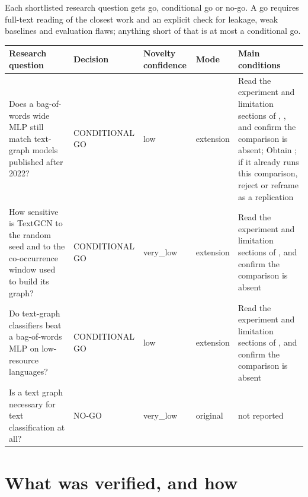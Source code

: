 \documentclass[11pt,a4paper]{article}
\begin{document}
Each shortlisted research question gets go, conditional go or no-go. A go requires full-text reading of the closest work and an explicit check for leakage, weak baselines and evaluation flaws; anything short of that is at most a conditional go.

{\small
\begin{longtable}{>{\raggedright\arraybackslash}p{}>{\raggedright\arraybackslash}p{}>{\raggedright\arraybackslash}p{}>{\raggedright\arraybackslash}p{}>{\raggedright\arraybackslash}p{}}
\toprule
\textbf{Research question} & \textbf{Decision} & \textbf{Novelty confidence} & \textbf{Mode} & \textbf{Main conditions} \\
\midrule
\endhead
Does a bag-of-words wide MLP still match text-graph models published after 2022? & CONDITIONAL GO & low & extension & Read the experiment and limitation sections of \cite{galke2022}, \cite{abdalla2023}, \cite{donabauer2025} and confirm the comparison is absent; Obtain \cite{abdalla2023}; if it already runs this comparison, reject or reframe as a replication \\
How sensitive is TextGCN to the random seed and to the co-occurrence window used to build its graph? & CONDITIONAL GO & very\_low & extension & Read the experiment and limitation sections of \cite{shchur2019}, \cite{galke2022} and confirm the comparison is absent \\
Do text-graph classifiers beat a bag-of-words MLP on low-resource languages? & CONDITIONAL GO & low & extension & Read the experiment and limitation sections of \cite{ghosh2022}, \cite{galke2022} and confirm the comparison is absent \\
Is a text graph necessary for text classification at all? & NO-GO & very\_low & original & not reported \\
\bottomrule
\end{longtable}
}

\section{What was verified, and how}
\end{document}
